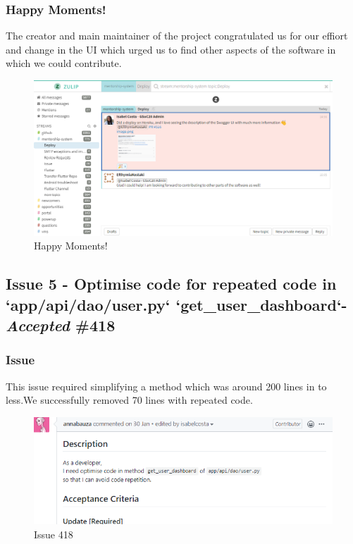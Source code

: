 \documentclass{article}
\begin{document}
\vfill
\clearpage
\subsubsection{Happy Moments!}
The creator and main maintainer of the project congratulated us for our effiort and change in the UI which urged us to find other aspects of the software in which we could contribute.
\begin{figure}[tph!]
\centerline{\includegraphics[totalheight=10cm, width=15cm]{Happy-Moments.png}}
    \caption{Happy Moments!}
    \label{fig:verticalcell}
\end{figure}
\vfill
\clearpage

\subsection{Issue 5 - Optimise code for repeated code in `app/api/dao/user.py` `get\_user\_dashboard`- \emph{Accepted} \#418}
\subsubsection{Issue}
\hspace{0.5cm}This issue required simplifying a method which was around 200 lines in to less.We successfully removed 70 lines with repeated code.
\begin{figure}[tph!]
\centerline{\includegraphics[totalheight=5cm, width=14cm]{issue418.png}}
    \caption{Issue 418}
    \label{fig:verticalcell}
\end{figure}
\vfill
\clearpage
\end{document}
